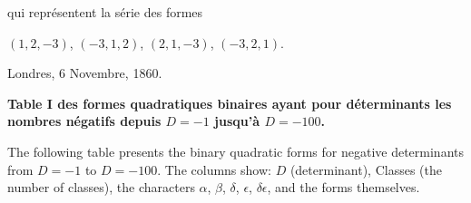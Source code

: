 \documentclass[11pt,a4paper]{article}
\begin{document}
qui repr\'{e}sentent la s\'{e}rie des formes

\begin{center}
$(1,2,-3)$, $(-3,1,2)$, $(2,1,-3)$, $(-3,2,1)$.
\end{center}

\begin{flushright}
Londres, 6 Novembre, 1860.
\end{flushright}

\newpage
\noindent\textbf{Table I des formes quadratiques binaires ayant pour d\'{e}terminants les nombres n\'{e}gatifs depuis $D=-1$ jusqu'\`{a} $D=-100$.}

\medskip

\noindent The following table presents the binary quadratic forms for negative determinants from $D=-1$ to $D=-100$. The columns show: $D$ (determinant), Classes (the number of classes), the characters $\alpha$, $\beta$, $\delta$, $\epsilon$, $\delta\epsilon$, and the forms themselves.

\medskip
\end{document}
